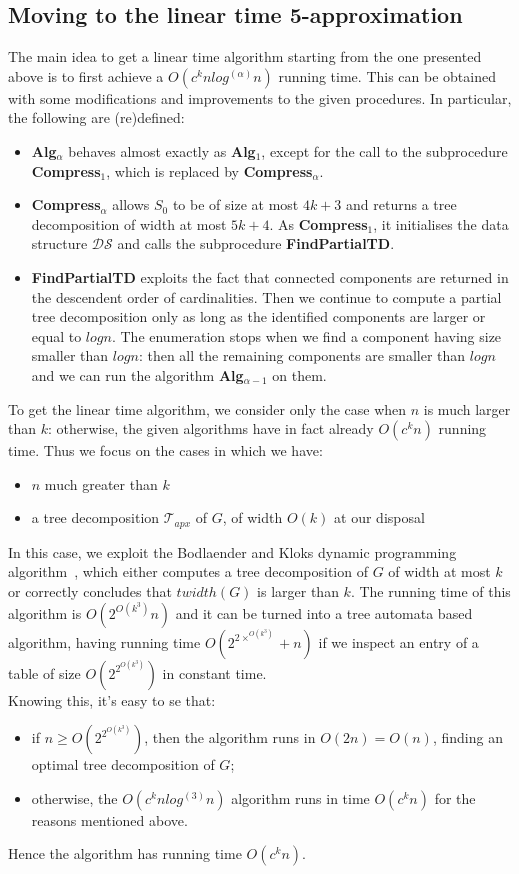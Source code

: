 \documentclass{article}
\theoremstyle{definition}
\theoremstyle{lemma}
\theoremstyle{corollary}
\theoremstyle{theorem}
\begin{document}
\subsection{Moving to the linear time 5-approximation}
The main idea to get a linear time algorithm starting from the one presented above is to first achieve a 
$O(c^k nlog^{(\alpha)}n)$ running time. This can be obtained with some modifications and improvements to the given procedures. In particular, the following are (re)defined:
\begin{itemize}
	\item \textbf{Alg$_\alpha$} behaves almost exactly as \textbf{Alg$_1$}, except for the call to the
	subprocedure \textbf{Compress$_1$}, which is replaced by \textbf{Compress$_\alpha$}.
	\item \textbf{Compress$_\alpha$} allows $S_0$ to be of size at most $4k + 3$ and returns a tree 
	decomposition of width at most $5k + 4$. As \textbf{Compress$_1$}, it initialises the data structure
	$\mathcal{DS}$ and calls the subprocedure \textbf{FindPartialTD}.
	\item \textbf{FindPartialTD} exploits the fact that connected components are returned in the
	descendent order of cardinalities. Then we continue to compute a partial tree decomposition only as
	long as the identified components are larger or equal to $logn$. The enumeration stops when we find
	a component having size smaller than $logn$: then all the remaining components are smaller than
	$logn$ and we can run the algorithm \textbf{Alg$_{\alpha - 1}$} on them.
\end{itemize}
To get the linear time algorithm, we consider only the case when $n$ is much larger than $k$: otherwise, the given algorithms have in fact already $O(c^k n)$ running time. Thus we focus on the cases in which we have:
\begin{itemize}
	\item $n$ much greater than $k$
	\item a tree decomposition $\mathcal{T}_{apx}$ of $G$, of width $O(k)$ at our disposal
\end{itemize}
In this case, we exploit the Bodlaender and Kloks dynamic programming algorithm~\cite{bodlaender}, which either computes a tree decomposition of $G$ of width at most $k$ or correctly concludes that $twidth(G)$ is larger than $k$. The running time of this algorithm is $O(2^{O(k^3)} n)$ and it can be turned into a tree automata based algorithm, having running time $O(2^{2×^{O(k^3)}} + n)$ if we inspect an entry of a table of size $O(2^{2^{O(k^3)}})$ in constant time. \\
Knowing this, it's easy to se that:
\begin{itemize}
	\item if $n \geq O(2^{2^{O(k^3)}})$, then the algorithm runs in $O(2n) = O(n)$, finding an optimal
	tree decomposition of $G$;
	\item otherwise, the $O(c^k nlog^{(3)}n)$ algorithm runs in time $O(c^k n)$ for the reasons mentioned
	above.
\end{itemize}
Hence the algorithm has running time $O(c^k n)$.
\end{document}
